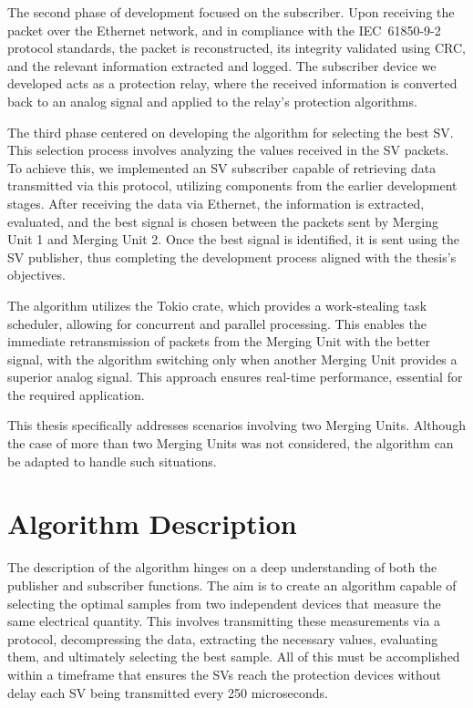 The second phase of development focused on the subscriber. Upon receiving the packet over the Ethernet network, and in compliance with the IEC~61850-9-2 protocol standards, the packet is reconstructed, its integrity validated using CRC, and the relevant information extracted and logged. The subscriber device we developed acts as a protection relay, where the received information is converted back to an analog signal and applied to the relay’s protection algorithms.

The third phase centered on developing the algorithm for selecting the best SV. This selection process involves analyzing the values received in the SV packets. To achieve this, we implemented an SV subscriber capable of retrieving data transmitted via this protocol, utilizing components from the earlier development stages. After receiving the data via Ethernet, the information is extracted, evaluated, and the best signal is chosen between the packets sent by Merging Unit 1 and Merging Unit 2. Once the best signal is identified, it is sent using the SV publisher, thus completing the development process aligned with the thesis's objectives.

The algorithm utilizes the Tokio crate, which provides a work-stealing task scheduler, allowing for concurrent and parallel processing. This enables the immediate retransmission of packets from the Merging Unit with the better signal, with the algorithm switching only when another Merging Unit provides a superior analog signal. This approach ensures real-time performance, essential for the required application.

This thesis specifically addresses scenarios involving two Merging Units. Although the case of more than two Merging Units was not considered, the algorithm can be adapted to handle such situations.
	
\section{Algorithm Description}

The description of the algorithm hinges on a deep understanding of both the publisher and subscriber functions. The aim is to create an algorithm capable of selecting the optimal samples from two independent devices that measure the same electrical quantity. This involves transmitting these measurements via a protocol, decompressing the data, extracting the necessary values, evaluating them, and ultimately selecting the best sample. All of this must be accomplished within a timeframe that ensures the SVs reach the protection devices without delay each SV being transmitted every 250 microseconds.

